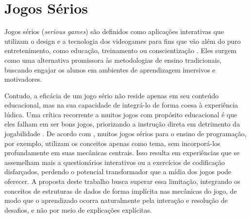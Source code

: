 \section{Jogos Sérios}

Jogos sérios (\emph{serious games}) são definidos como aplicações interativas que utilizam
o design e a tecnologia dos videogames para fins que vão além do puro
entretenimento, como educação, treinamento ou conscientização
\cite{mouaheb2012serious}. Eles surgem como uma alternativa promissora às
metodologias de ensino tradicionais, buscando engajar os alunos em ambientes de
aprendizagem imersivos e motivadores.

Contudo, a eficácia de um jogo sério não reside apenas em seu conteúdo
educacional, mas na sua capacidade de integrá-lo de forma coesa à experiência
lúdica. Uma crítica recorrente a muitos jogos com propósito educacional é que
eles falham em ser bons jogos, priorizando a instrução direta em detrimento da
jogabilidade \cite{mouaheb2012serious}. De acordo com
, muitos jogos sérios para o ensino de programação, por
exemplo, utilizam os conceitos apenas como tema, sem incorporá-los
profundamente em suas mecânicas centrais. Isso resulta em experiências que se
assemelham mais a questionários interativos ou a exercícios de codificação
disfarçados, perdendo o potencial transformador que a mídia dos jogos pode
oferecer. A proposta deste trabalho busca superar essa limitação, integrando os
conceitos de estruturas de dados de forma implícita nas mecânicas do jogo, de
modo que o aprendizado ocorra naturalmente pela interação e resolução de
desafios, e não por meio de explicações explícitas.
